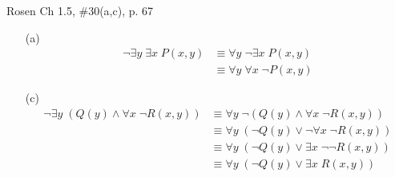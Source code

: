 \documentclass[12pt,addpoints]{exam}
\begin{document}
\begin{questions}
\question Rosen Ch 1.5, \#30(a,c), p. 67
    \ifprintanswers
        \vspace{-10pt}
    \fi
\begin{solution}
    \begin{itemize}[itemsep=0pt,parsep=0pt,topsep=0pt,partopsep=0pt]
        \item[(a)]
        \begin{align*}
          \neg \exists y\; \exists x\; P(x,y) & \equiv \forall y\; \neg \exists x\; P(x,y) \\
          & \equiv \forall y\; \forall x\; \neg P(x,y)
        \end{align*}
        \item[(c)]
        \vspace{-15pt}
        \begin{align*}
          \neg \exists y\; (Q(y) \wedge \forall x\; \neg R(x,y)) & \equiv \forall y\; \neg(Q(y) \wedge \forall x\; \neg R(x,y)) \\
          & \equiv \forall y\; (\neg Q(y) \vee \neg \forall x\; \neg R(x,y)) \\
          & \equiv \forall y\; (\neg Q(y) \vee \exists x\; \neg \neg R(x,y))\\
          & \equiv \forall y\; (\neg Q(y) \vee \exists x\; R(x,y))
        \end{align*}

\end{itemize}
\end{solution}
\end{questions}
\end{document}
